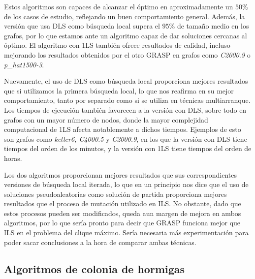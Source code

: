 Estos algoritmos son capaces de alcanzar el óptimo en aproximadamente un $50\%$ de
los casos de estudio, reflejando un buen comportamiento general. Además, la versión
que usa DLS como búsqueda local supera el $95\%$ de tamaño medio en los grafos, por
lo que estamos ante un algoritmo capaz de dar soluciones cercanas al óptimo.
El algoritmo con 1LS también ofrece resultados de calidad, incluso mejorando los
resultados obtenidos por el otro GRASP en grafos como \textit{C2000.9} o \textit{p\_hat1500-3}.

Nuevamente, el uso de DLS como búsqueda local proporciona mejores resultados que
si utilizamos la primera búsqueda local, lo que nos reafirma en su mejor comportamiento,
tanto por separado como si se utiliza en técnicas multiarranque. Los tiempos de
ejecución también favorecen a la versión con DLS, sobre todo en grafos con un mayor
número de nodos, donde la mayor complejidad computacional de 1LS afecta notablemente
a dichos tiempos. Ejemplos de esto son grafos como \textit{keller6, C4000.5} y \textit{C2000.9},
en los que la versión con DLS tiene tiempos del orden de los minutos, y la versión
con 1LS tiene tiempos del orden de horas.

Los dos algoritmos proporcionan mejores resultados que sus correspondientes versiones
de búsqueda local iterada, lo que en un principio nos dice que el uso de soluciones
pseudoaleatorias como solución de partida proporciona mejores resultados que el proceso
de mutación utilizado en ILS. No obstante, dado que estos procesos pueden ser modificados,
queda aun margen de mejora en ambos algoritmos, por lo que sería pronto para decir que
GRASP funciona mejor que ILS en el problema del clique máximo. Sería necesaria más
experimentación para poder sacar conclusiones a la hora de comparar ambas técnicas.

\subsection{Algoritmos de colonia de hormigas}


